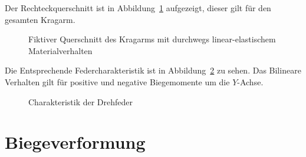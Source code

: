\documentclass[
  11pt,
  letterpaper,
]{scrreprt}
\begin{document}
Der Rechteckquerschnitt ist in Abbildung~\ref{fig-qs-kragarm}
aufgezeigt, dieser gilt für den gesamten Kragarm.

\begin{figure}[H]


\caption{\label{fig-qs-kragarm}Fiktiver Querschnitt des Kragarms mit
durchwegs linear-elastischem Materialverhalten}

\end{figure}%

Die Entsprechende Federcharakteristik ist in
Abbildung~\ref{fig-springcharacteristic} zu sehen. Das Bilineare
Verhalten gilt für positive und negative Biegemomente um die
\(Y\)-Achse.

\begin{figure}[H]


\caption{\label{fig-springcharacteristic}Charakteristik der Drehfeder}

\end{figure}%

\section{Biegeverformung}\label{biegeverformung}
\end{document}

